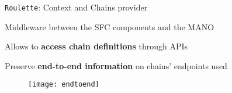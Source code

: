 \begin{frame}{\texttt{Roulette}: Context and Chains provider}

  Middleware between the SFC components and the MANO

  \vfill{}

  Allows to \textbf{access chain definitions} through APIs

  \vfill{}

  Preserve \textbf{end-to-end information} on chains' endpoints used

  \vfill{}

  \begin{figure}
    \centering
    \texttt{[image: endtoend]}
  \end{figure}

\end{frame}